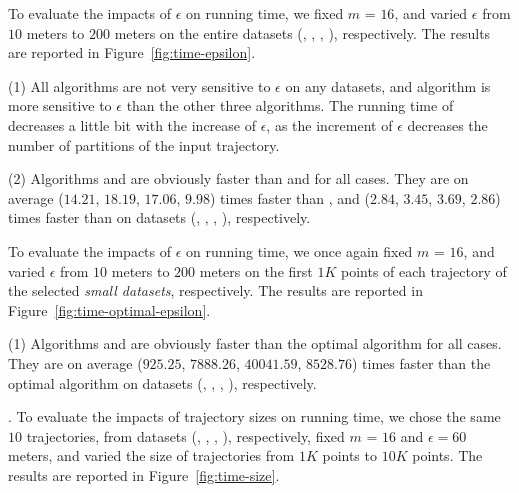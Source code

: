 {%
To evaluate the impacts of $\epsilon$ on running time, we fixed $m$ = $16$,
and varied $\epsilon$  from $10$ meters to $200$ meters on the entire
datasets (\sercar, \geolife, \mopsi, \pricar), respectively.
The results are reported in Figure~\ref{fig:time-epsilon}.

\ni(1) All algorithms are not very sensitive to $\epsilon$ on any datasets, and algorithm \dps is more sensitive to $\epsilon$ than the other three algorithms.
The running time of \dps decreases a little bit with the increase of $\epsilon$, as the increment of $\epsilon$ decreases the number of partitions of the input trajectory.


\ni(2) Algorithms \cist and \cista are obviously faster than \dps and \squishe for all cases.
They are on average ($14.21$, $18.19$, $17.06$, $9.98$) times faster than \dps,
and ($2.84$, $3.45$, $3.69$, $2.86$) times faster than \squishe on
{datasets} (\sercar, \geolife, \mopsi, \pricar), respectively.

To evaluate the impacts of $\epsilon$ on running time, we once again fixed $m$ = $16$,
and varied $\epsilon$ from $10$ meters to $200$ meters on the first $1K$ points of each trajectory of the selected \textit{small datasets}, respectively.
The results are reported in Figure~\ref{fig:time-optimal-epsilon}.

\ni(1) Algorithms \cist and \cista are obviously faster than the optimal algorithm for all cases.
They are on average ($925.25$, $7888.26$, $40041.59$, $8528.76$) times faster than the optimal algorithm on
datasets (\sercar, \geolife, \mopsi, \pricar), respectively.

.
To evaluate the impacts of trajectory sizes on running time,
we chose the same {$10$} trajectories, from datasets (\sercar, \geolife, \mopsi, \pricar), respectively,
fixed $m$ = $16$ and $\epsilon = 60$ meters, and varied the size  of trajectories from $1K$ points to $10K$ points.
%
The results are reported in Figure~\ref{fig:time-size}.

}
